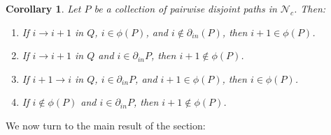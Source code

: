 \documentclass[12pt]{amsart}
\newcommand{\cN}{\mathcal{N}} %
\newtheorem{corollary}[theorem]{Corollary}
\theoremstyle{remark}
\numberwithin{equation}{section}
\begin{document}
\begin{corollary}
  Let $P$ be a collection of pairwise disjoint paths in $\cN_c$.  Then:
  \begin{enumerate}
    \item If $i \to i+1$ in $Q$, $i \in \phi(P)$, and $i \notin \partial_{in}(P)$, then $i + 1 \in \phi(P)$.
    \item If $i \to i+1$ in $Q$ and $i \in \partial_{in}P$, then $i +1 \notin \phi(P)$.
    \item If $i+1 \to i$ in $Q$, $i \in \partial_{in}P$, and $i+1 \in \phi(P)$, then $i \in \phi(P)$.
    \item If $i \notin \phi(P)$ and $i \in \partial_{in}P$, then $i +1 \notin \phi(P)$.
  \end{enumerate}
\end{corollary}

We now turn to the main result of the section:
\end{document}
